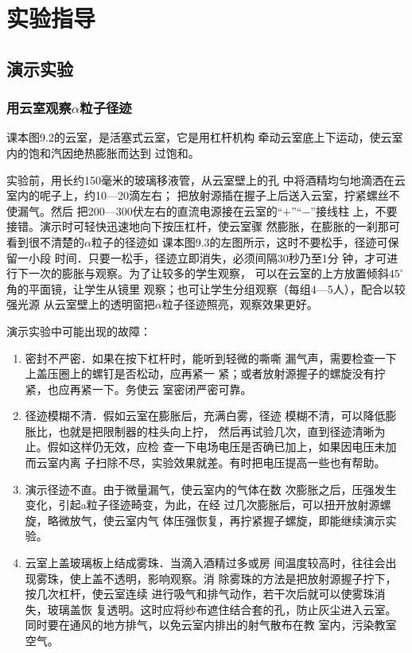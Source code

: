 \section{实验指导}
\subsection{演示实验}
\subsubsection{用云室观察$\alpha$粒子径迹}

课本图9.2的云室，是活塞式云室，它是用杠杆机构
牵动云室底上下运动，使云室内的饱和汽因绝热膨胀而达到
过饱和。

实验前，用长约150毫米的玻璃移液管，从云室壁上的孔
中将酒精均匀地滴洒在云室内的呢子上，约10—20滴左右；
把放射源插在握子上后送入云室，拧紧螺丝不使漏气。然后
把200—300伏左右的直流电源接在云室的“$+$”“$-$”接线柱
上，不要接错。演示时可轻快迅速地向下按压杠杆，使云室骤
然膨胀，在膨胀的一刹那可看到很不清楚的$\alpha$粒子的径迹如
课本图9.3的左图所示，这时不要松手，径迹可保留一小段
时间．只要一松手，径迹立即消失，必须间隔30秒乃至1分
钟，才可进行下一次的膨胀与观察。为了让较多的学生观察，
可以在云室的上方放置倾斜$45^{\circ}$角的平面镜，让学生从镜里
观察；也可让学生分组观察（每组4—5人），配合以较强光源
从云室壁上的透明窗把$\alpha$粒子径迹照亮，观察效果更好。

演示实验中可能出现的故障：
\begin{enumerate}
    \item 密封不严密．如果在按下杠杆时，能听到轻微的嘶嘶
漏气声，需要检查一下上盖压圈上的螺钉是否松动，应再紧一
紧；或者放射源握子的螺旋没有拧紧，也应再紧一下。务使云
室密闭严密可靠。
\item 径迹模糊不清．假如云室在膨胀后，充满白雾，径迹
模糊不清，可以降低膨胀比，也就是把限制器的柱头向上拧，
然后再试验几次，直到径迹清晰为止。假如这样仍无效，应检
查一下电场电压是否确已加上，如果因电压未加而云室内离
子扫除不尽，实验效果就差。有时把电压提高一些也有帮助。
\item 演示径迹不直。由于微量漏气，使云室内的气体在数
次膨胀之后，压强发生变化，引起a粒子径迹畸变，为此，在经
过几次膨胀后，可以扭开放射源螺旋，略微放气，使云室内气
体压强恢复，再拧紧握子螺旋，即能继续演示实验。
\item 云室上盖玻璃板上结成雾珠．当滴入酒精过多或房
间温度较高时，往往会出现雾珠，使上盖不透明，影响观察。消
除雾珠的方法是把放射源握子拧下，按几次杠杆，使云室连续
进行吸气和排气动作，若干次后就可以使雾珠消失，玻璃盖恢
复透明。这时应将纱布遮住结合套的孔，防止灰尘进入云室。
同时要在通风的地方排气，以免云室内排出的射气散布在教
室内，污染教室空气。
\end{enumerate}

